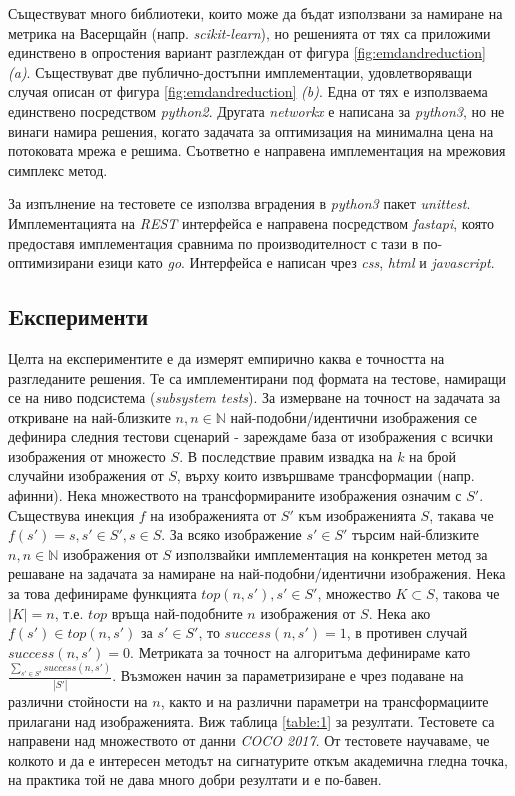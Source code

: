 \documentclass[a4paper,12pt]{article}
\begin{document}
\bigbreak

Съществуват много библиотеки, които може да бъдат използвани за намиране на метрика на Васерщайн (напр. \textit{scikit-learn}), но решенията от тях са приложими единствено в опростения вариант разглеждан от фигура \ref{fig:emdandreduction} \textit{(a)}. Съществуват две публично-достъпни имплементации, удовлетворяващи случая описан от фигура \ref{fig:emdandreduction} \textit{(b)}. Една от тях е използваема единствено посредством \textit{python2}. Другата \textit{networkx} е написана за \textit{python3}, но не винаги намира решения, когато задачата за оптимизация на минимална цена на потоковата мрежа е решима. Съответно е направена имплементация на мрежовия симплекс метод.

\bigbreak

За изпълнение на тестовете се използва вградения в \textit{python3} пакет \textit{unittest}. Имплементацията на \textit{REST} интерфейса е направена посредством \textit{fastapi}, която предоставя имплементация сравнима по производителност с тази в по-оптимизирани езици като \textit{go}. Интерфейса е написан чрез \textit{css}, \textit{html} и \textit{javascript}.

\subsection{Eксперименти}

Целта на експериментите е да измерят емпирично каква е точността на разгледаните решения. Те са имплементирани под формата на тестове, намиращи се на ниво подсистема (\textit{subsystem tests}). За измерване на точност на задачата за откриване на най-близките $n, n \in \mathbb{N}$ най-подобни/идентични изображения се дефинира следния тестови сценарий - зареждаме база от изображения с всички изображения от множесто $S$. В последствие правим извадка на $k$ на брой случайни изображения от $S$, върху които извършваме трансформации (напр. афинни). Нека множеството на трансформираните изображения означим с $S'$. Съществува инекция $f$ на изображенията от $S'$ към изображенията $S$, такава че $f(s') = s, s' \in S', s \in S$. За всяко изображение $s' \in S'$ търсим най-близките $n, n \in \mathbb{N}$ изображения от $S$ използвайки имплементация на конкретен метод за решаване на задачата за намиране на най-подобни/идентични изображения. Нека за това дефинираме функцията $top(n, s'), s' \in S'$, множество $K \subset S$, такова че $|K| = n$, т.е. $top$ връща най-подобните $n$ изображения от $S$. Нека ако $f(s') \in top(n, s')$ за $s' \in S'$, то $success(n, s') = 1$, в противен случай $success(n, s') = 0$. Метриката за точност на алгоритъма дефинираме като $\frac{\sum_{s' \in S'} success(n, s')}{|S'|}$. Възможен начин за параметризиране е чрез подаване на различни стойности на $n$, както и на различни параметри на трансформациите прилагани над изображенията. Виж таблица \ref{table:1} за резултати. Тестовете са направени над множеството от данни \textit{COCO 2017}. От тестовете научаваме, че колкото и да е интересен методът на сигнатурите откъм академична гледна точка, на практика той не дава много добри резултати и е по-бавен.
\end{document}
